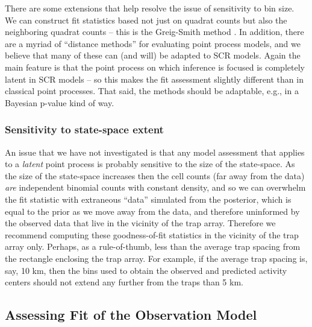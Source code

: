 There are some extensions that help resolve the issue of sensitivity
to bin size. We can construct fit statistics based not just
on quadrat counts but also the neighboring quadrat counts -- this is
the Greig-Smith method \citep{greig-smith:1964}.
In addition, there are a myriad of ``distance
methods'' for evaluating point process models,
 and we believe that many
of these can (and will) be adapted to SCR models.
Again the main
feature is that the point process on which inference is focused is
completely latent in SCR models -- so this makes the fit assessment
slightly different than in classical point processes. That said, the
methods should be adaptable, e.g., in a Bayesian p-value kind of way.


\subsubsection{Sensitivity to state-space extent}

An issue that we have not investigated is that any model assessment
that applies to a {\it latent} point process is probably sensitive to
the size of the state-space. As the size of the state-space increases
then the cell counts (far away from the data) {\it are} independent
binomial counts with constant density, and so we can overwhelm the fit
statistic with extraneous ``data'' simulated from the posterior, which
is equal to the prior as we move away from the data, and therefore
uninformed by the observed data  that live in the vicinity of the trap array.
Therefore we recommend computing these goodness-of-fit statistics in the vicinity
of the trap array only. Perhaps, as a rule-of-thumb, less than the
average trap spacing from the rectangle enclosing the trap array.
For example, if the average trap spacing is, say,
10 km, then the bins used to obtain the observed and predicted
activity centers should not extend any further from the traps than 5
km.




\subsection{Assessing  Fit of the Observation Model}
\label{gof.sec.obsfit}

